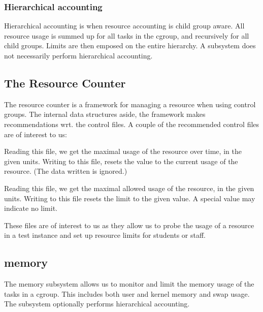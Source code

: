 \subsubsection{Hierarchical accounting}

Hierarchical accounting is when resource accounting is child group aware. All
resource usage is summed up for all tasks in the cgroup, and recursively
for all child groups. Limits are then emposed on the entire hierarchy. A
subsystem does not necessarily perform hierarchical accounting.

\subsection{The Resource Counter}

\label{section:cgroups:resource-counter}

The resource counter is a framework for managing a resource when using control
groups\cite{resource-counter.txt}.  The internal data structures aside, the
framework makes recommendations wrt. the control files. A couple of the
recommended control files are of interest to us:

\begin{description}[\setleftmargin{0.2in}\breaklabel\setlabelstyle{\tt}]

\item[<resource>.max\_usage\_in\_<unit\_of\_measurement>] Reading this file, we
get the maximal usage of the resource over time, in the given units. Writing to
this file, resets the value to the current usage of the resource. (The data
written is ignored.)

\item[<resource>.limit\_in\_<unit\_of\_measurement>] Reading this file, we get
the maximal allowed usage of the resource, in the given units. Writing to this
file resets the limit to the given value. A special value may indicate no
limit.

\end{description}

These files are of interest to us as they allow us to probe the usage of a
resource in a test instance and set up resource limits for students or staff.

\subsection{memory}

The memory subsystem allows us to monitor and limit the memory usage of the
tasks in a cgroup\cite{memory.txt}. This includes both user and kernel memory
and swap usage.  The subsystem optionally performs hierarchical accounting.

